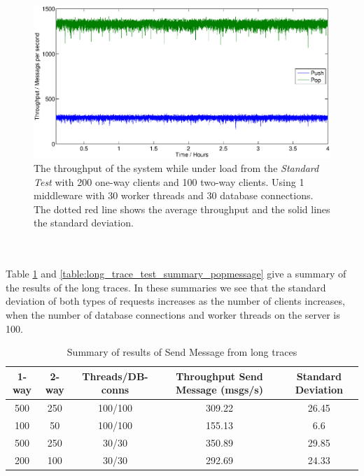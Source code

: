 \documentclass{article}
\begin{document}
            \begin{figure}[H]
                \hspace{-4.5cm}
                \includegraphics[scale=0.750]{4h_throughput}
                \caption{The throughput of the system while under load from the \textit{Standard Test} with 200 one-way clients and 100 two-way clients. Using 1 middleware with 30 worker threads and 30 database connections. The dotted red line shows the average throughput and the solid lines the standard deviation.}
                \label{fig:4h_throughput}
            \end{figure}
            ~\\
            ~\\
            Table \ref{table:long_trace_test_summary_sendmessage} and \ref{table:long_trace_test_summary_popmessage} give a summary of the results of the long traces. In these summaries we see that the standard deviation of both types of requests increases as the number of clients increases, when the number of database connections and worker threads on the server is 100. 

            \begin{table}[H]
                \label{table:long_trace_test_summary_sendmessage}
                \caption{Summary of results of Send Message from long traces}
                \begin{tabular}{|c|c|c|c|c|}
                    \hline 
                    \textbf{1-way} & \textbf{2-way} & \textbf{Threads/DB-conns} & \textbf{Throughput Send Message (msgs/s)} & \textbf{Standard Deviation}\\ 
                    \hline 
                    500 & 250 & 100/100 &309.22 &26.45\\
                    \hline
                    100 & 50 & 100/100 &155.13 &6.6\\
                    \hline 
                    500 & 250 & 30/30 &350.89 &29.85\\
                    \hline
                    200 & 100 & 30/30 &292.69 &24.33\\
                    \hline
                \end{tabular} 
            \end{table}
\end{document}
